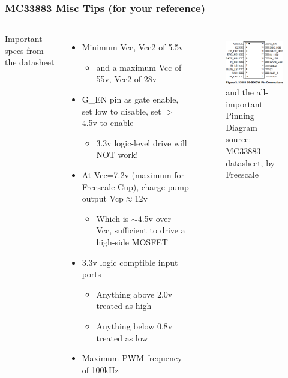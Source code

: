 \documentclass{beamer}
\begin{document}
\begin{frame}
\frametitle{MC33883 Misc Tips \small (for your reference)}
\begin{columns}[t]
Important specs from the datasheet
\begin{itemize}
  \item Minimum Vcc, Vcc2 of 5.5v
  \begin{itemize}
    \item and a maximum Vcc of 55v, Vcc2 of 28v
  \end{itemize}
  \item G\_EN pin as gate enable, set low to disable, set $>$4.5v to enable
  \begin{itemize}
    \item 3.3v logic-level drive will NOT work!
  \end{itemize}
  \item At Vcc=7.2v (maximum for Freescale Cup), charge pump output Vcp$\approx$12v
  \begin{itemize}
    \item Which is $\sim$4.5v over Vcc, sufficient to drive a high-side MOSFET
  \end{itemize}
  \item 3.3v logic comptible input ports
  \begin{itemize}
    \item Anything above 2.0v treated as high
    \item Anything below 0.8v treated as low
  \end{itemize}
  \item Maximum PWM frequency of 100kHz
\end{itemize}

\begin{figure}
  \centering
  \includegraphics[width=1.0\columnwidth]{images-dis3/mc33883-pinning} \\
  {\small and the all-important} \\ Pinning Diagram \\
  {\tiny source: MC33883 datasheet, by Freescale}
\end{figure}
\end{columns}
\end{frame}
\end{document}
